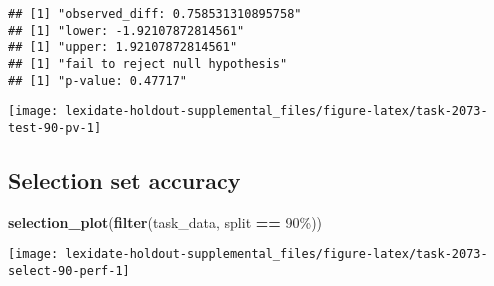 \documentclass[
]{book}
\newenvironment{Shaded}{\begin{snugshade}}{\end{snugshade}}
\newcommand{\AttributeTok}[1]{\textcolor[rgb]{0.13,0.29,0.53}{#1}}
\newcommand{\DecValTok}[1]{\textcolor[rgb]{0.00,0.00,0.81}{#1}}
\newcommand{\FunctionTok}[1]{\textcolor[rgb]{0.13,0.29,0.53}{\textbf{#1}}}
\newcommand{\NormalTok}[1]{#1}
\newcommand{\OtherTok}[1]{\textcolor[rgb]{0.56,0.35,0.01}{#1}}
\newcommand{\SpecialCharTok}[1]{\textcolor[rgb]{0.81,0.36,0.00}{\textbf{#1}}}
\newcommand{\StringTok}[1]{\textcolor[rgb]{0.31,0.60,0.02}{#1}}
\begin{document}
\begin{Shaded}
\end{Shaded}

\begin{verbatim}
## [1] "observed_diff: 0.758531310895758"
## [1] "lower: -1.92107872814561"
## [1] "upper: 1.92107872814561"
## [1] "fail to reject null hypothesis"
## [1] "p-value: 0.47717"
\end{verbatim}

\texttt{[image: lexidate-holdout-supplemental\_files/figure-latex/task-2073-test-90-pv-1]}

\hypertarget{selection-set-accuracy-43}{%
\subsection{Selection set accuracy}\label{selection-set-accuracy-43}}

\begin{Shaded}
\begin{Highlighting}[]
\FunctionTok{selection\_plot}\NormalTok{(}\FunctionTok{filter}\NormalTok{(task\_data, split }\SpecialCharTok{==} \StringTok{\textquotesingle{}90\%\textquotesingle{}}\NormalTok{))}
\end{Highlighting}
\end{Shaded}

\texttt{[image: lexidate-holdout-supplemental\_files/figure-latex/task-2073-select-90-perf-1]}
\end{document}
